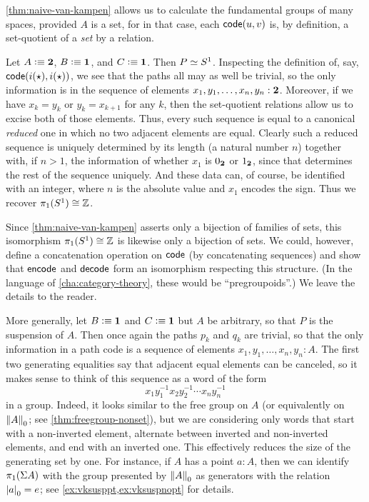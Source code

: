 %

\autoref{thm:naive-van-kampen} allows us to calculate the fundamental groups of many spaces, provided $A$ is a set,
for in that case, each $\code(u,v)$ is, by definition, a set-quotient of a \emph{set} by a relation.

\begin{eg}\label{eg:circle}
  Let $A\defeq \bool$, $B\defeq\unit$, and $C\defeq \unit$.
  Then $P \eqvsym S^1$.
  Inspecting the definition of, say, $\code(i(\ttt),i(\ttt))$, we see that the paths all may as well be trivial, so the only information is in the sequence of elements $x_1,y_1,\dots,x_n,y_n: \bool$.
  Moreover, if we have $x_k=y_k$ or $y_k=x_{k+1}$ for any $k$, then the set-quotient relations allow us to excise both of those elements.
  Thus, every such sequence is equal to a canonical \emph{reduced} one in which no two adjacent elements are equal.
  Clearly such a reduced sequence is uniquely determined by its length (a natural number $n$) together with, if $n>1$, the information of whether $x_1$ is $\bfalse$ or $\btrue$, since that determines the rest of the sequence uniquely.
  And these data can, of course, be identified with an integer, where $n$ is the absolute value and $x_1$ encodes the sign.
  Thus we recover $\pi_1(S^1)\cong \Z$.
\end{eg}

Since \autoref{thm:naive-van-kampen} asserts only a bijection of families of sets, this isomorphism $\pi_1(S^1)\cong \Z$ is likewise only a bijection of sets.
We could, however, define a concatenation operation on $\code$ (by concatenating sequences) and show that $\encode$ and $\decode$ form an isomorphism respecting this structure.
(In the language of \autoref{cha:category-theory}, these would be ``pregroupoids''.)
We leave the details to the reader.

%

\begin{eg}\label{eg:suspension}
  More generally, let $B\defeq\unit$ and $C\defeq \unit$ but $A$ be arbitrary, so that $P$ is the suspension of $A$.
  Then once again the paths $p_k$ and $q_k$ are trivial, so that the only information in a path code is a sequence of elements $x_1,y_1,\dots,x_n,y_n: A$.
  The first two generating equalities say that adjacent equal elements can be canceled, so it makes sense to think of this sequence as a word of the form
  \[ x_1 y_1^{-1} x_2 y_2^{-1} \cdots x_n y_n^{-1} \]
  in a group.
  Indeed, it looks similar to the free group on $A$ (or equivalently on $\trunc0A$; see \autoref{thm:freegroup-nonset}), but we are considering only words that start with a non-inverted element, alternate between inverted and non-inverted elements, and end with an inverted one.
  This effectively reduces the size of the generating set by one.
  For instance, if $A$ has a point $a:A$, then we can identify $\pi_1(\susp A)$ with the group presented by $\trunc0A$ as generators with the relation $\tproj0a = e$; see \autoref{ex:vksusppt,ex:vksuspnopt} for details.
\end{eg}

